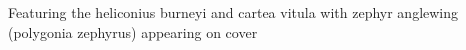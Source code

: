 Featuring the heliconius burneyi and cartea vitula
with zephyr anglewing (polygonia zephyrus) appearing on cover